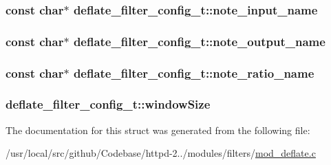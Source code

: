 \subsubsection[{\texorpdfstring{note\+\_\+input\+\_\+name}{note_input_name}}]{\setlength{\rightskip}{0pt plus 5cm}const char$\ast$ deflate\+\_\+filter\+\_\+config\+\_\+t\+::note\+\_\+input\+\_\+name}\hypertarget{structdeflate__filter__config__t_a42fe3bd994c2265abe711b06fdb674a4}{}\label{structdeflate__filter__config__t_a42fe3bd994c2265abe711b06fdb674a4}
\subsubsection[{\texorpdfstring{note\+\_\+output\+\_\+name}{note_output_name}}]{\setlength{\rightskip}{0pt plus 5cm}const char$\ast$ deflate\+\_\+filter\+\_\+config\+\_\+t\+::note\+\_\+output\+\_\+name}\hypertarget{structdeflate__filter__config__t_ac185f14d2bf7cf7ef077a687bb07cf8a}{}\label{structdeflate__filter__config__t_ac185f14d2bf7cf7ef077a687bb07cf8a}
\subsubsection[{\texorpdfstring{note\+\_\+ratio\+\_\+name}{note_ratio_name}}]{\setlength{\rightskip}{0pt plus 5cm}const char$\ast$ deflate\+\_\+filter\+\_\+config\+\_\+t\+::note\+\_\+ratio\+\_\+name}\hypertarget{structdeflate__filter__config__t_aadd3936bb91c587fbb3629459d7ea587}{}\label{structdeflate__filter__config__t_aadd3936bb91c587fbb3629459d7ea587}
\subsubsection[{\texorpdfstring{window\+Size}{windowSize}}]{ deflate\+\_\+filter\+\_\+config\+\_\+t\+::window\+Size}\hypertarget{structdeflate__filter__config__t_a7792c409d3cbcd653e97ce1c9a001a69}{}\label{structdeflate__filter__config__t_a7792c409d3cbcd653e97ce1c9a001a69}


The documentation for this struct was generated from the following file\+:\begin{DoxyCompactItemize}
\item 
/usr/local/src/github/\+Codebase/httpd-\/2../modules/filters/\hyperlink{mod__deflate_8c}{mod\+\_\+deflate.\+c}\end{DoxyCompactItemize}
